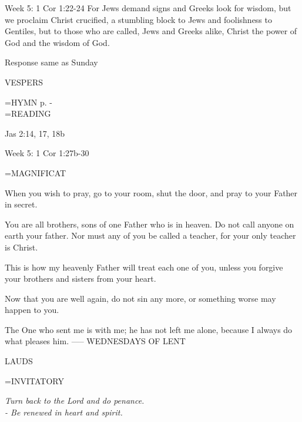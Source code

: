 Week 5:    1 Cor 1:22-24    For Jews demand signs and Greeks look for wisdom, but we proclaim Christ crucified, a stumbling block to Jews and foolishness to Gentiles, but to those who are called, Jews and Greeks alike, Christ the power of God and the wisdom of God. 

Response same as Sunday

\begin{flushleft}\normalsize VESPERS\\\end{flushleft}
\hangindent=\parindent \small{\uppercase{HYMN} p. \pageref{lent:firstHymn}-\pageref{lent:lastHymn}\\}
\hangindent=\parindent \small READING
\begin{description}[labelindent=\parindent, leftmargin=*]
\item [Weeks 1-4:]     Jas 2:14, 17, 18b \textbf{\\}
\end{description}

Week 5:    1 Cor 1:27b-30    

\hangindent=\parindent \small MAGNIFICAT
\begin{description}[labelindent=\parindent, leftmargin=*]
\item [Week 1:] 	When you wish to pray, go to your room, shut the door, and pray to your Father in secret.
\item [Week 2:] 	You are all brothers, sons of one Father who is in heaven. Do not call anyone on earth your father. Nor must any of you be called a teacher, for your only teacher is Christ.
\item [Week 3:] 	This is how my heavenly Father will treat each one of you, unless you forgive your brothers and sisters from your heart.
\item [Week 4:] 	Now that you are well again, do not sin any more, or something worse may happen to you.
\item [Week 5:] 	The One who sent me is with me; he has not left me alone, because I always do what pleases him.
-----
WEDNESDAYS OF LENT
\end{description}

\begin{flushleft}\normalsize LAUDS\\\end{flushleft}
\hangindent=\parindent \small{INVITATORY}
\begin{center}
\textit{Turn back to the Lord and do penance.\\}
\textit{- Be renewed in heart and spirit.\\}
\end{center}

